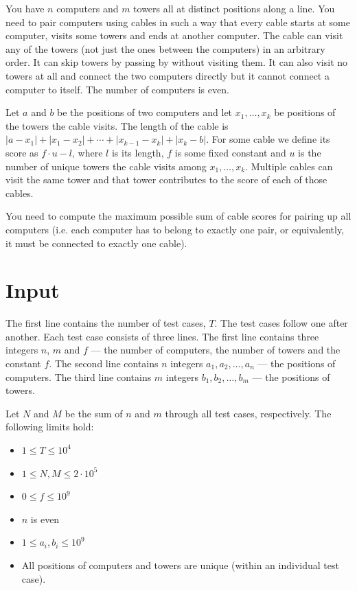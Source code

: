
You have $n$ computers and $m$ towers all at distinct positions along a line.
You need to pair computers using cables in such a way that every cable starts at
some computer, visits some towers and ends at another computer. The cable can
visit any of the towers (not just the ones between the computers) in an
arbitrary order. It can skip towers by passing by without visiting them. It can
also visit no towers at all and connect the two computers directly but it cannot
connect a computer to itself. The number of computers is even.

Let $a$ and $b$ be the positions of two computers and let $x_1, \ldots, x_k$ be
positions of the towers the cable visits. The length of the cable is
$|a-x_1| + |x_1-x_2| + \cdots + |x_{k-1}-x_k| + |x_k-b|$. For some cable we
define its score as $f \cdot u - l$, where $l$ is its length, $f$ is some fixed
constant and $u$ is the number of unique towers the cable visits among
$x_1, \ldots, x_k$. Multiple cables can visit the same tower and that tower
contributes to the score of each of those cables.

You need to compute the maximum possible sum of cable scores for pairing up all
computers (i.e. each computer has to belong to exactly one pair, or equivalently,
it must be connected to exactly one cable).

\section*{Input}
The first line contains the number of test cases, $T$. The test cases follow one
after another. Each test case consists of three lines. The first line contains
three integers $n$, $m$ and $f$ --- the number of computers, the number of
towers and the constant $f$. The second line contains $n$ integers
$a_1, a_2, \ldots, a_n$ --- the positions of computers. The third line contains
$m$ integers $b_1, b_2, \ldots, b_m$ --- the positions of towers.

Let $N$ and $M$ be the sum of $n$ and $m$ through all test cases, respectively.
The following limits hold:
\begin{itemize}
  \item $1 \leq T \leq 10^4$
  \item $1 \leq N, M \leq 2 \cdot 10^5$
  \item $0 \leq f \leq 10^9$
  \item $n$ is even
  \item $1 \leq a_i, b_i \leq 10^9$
  \item All positions of computers and towers are unique (within an individual
        test case).
\end{itemize}

